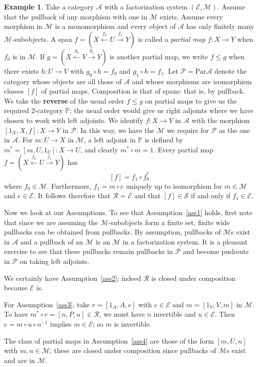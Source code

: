\documentclass[a4paper,12pt,reqno]{amsart}
\theoremstyle{definition}
\newtheorem{example}[theorem]{Example}
\theoremstyle{fact}
\theoremstyle{genquest}
\theoremstyle{step}
\newcommand{\lra}{\longrightarrow}
\newcommand{\lla}{\longleftarrow}
\newcommand{\ra}{\rightarrow}
\def\CA{{\mathscr A}}
\def\CE{{\mathscr E}}
\def\CM{{\mathscr M}}
\def\CP{{\mathscr P}}
\def\CR{{\mathscr R}}
\def\CS{{\mathscr S}}
\begin{document}
\begin{example}\label{Ex1+}
Take a category $\CA$ with a factorization system $(\CE,\CM)$. 
Assume that the pullback of any morphism with one in $\CM$ exists. 
Assume every morphism in $\CM$ is a monomorphism and every object
of $\CA$ has only finitely many $\CM$-subobjects. 
A span $f = (X\stackrel{f_0}\lla U \stackrel{f_1}\lra Y)$ is called a {\em partial map}
$f : X\lra Y$ when $f_0$ is in $\CM$. 
If $g = (X\stackrel{g_0}\lla V \stackrel{g_1}\lra Y)$ is another partial map,
we write $f\le g$ when there exists $h:U\ra V$ with $g_0\circ h=f_0$ and $g_1\circ h=f_1$.  
Let $\CP= \mathrm{Par}\CA$ 
denote the category
whose objects are all those of $\CA$ and whose morphisms are isomorphism
classes $[f]$ of partial maps. Composition is that of spans: that is, by pullback.
We take the \textbf{reverse} of the usual order $f\le g$ on partial maps to give us
the required 2-category $\mathbb{P}$; the usual order would give us right adjoints
where we have chosen to work with left adjoints.
We identify $f: X \ra Y$ in $\CA$ with the morphism $[1_X,X,f] : X \lra Y$ in $\CP$.
In this way, we have the $\CM$ we require for $\CP$ as the one in $\CA$.
For $m:U\ra X$ in $\CM$, a left adjoint in $\mathbb{P}$ is defined by 
$m^*= [m,U,1_U] : X\ra U$, and clearly $m^*\circ m = 1$.
Every partial map $f = (X\stackrel{f_0}\lla U \stackrel{f_1}\lra Y)$ has $$[f] = f_{1}\circ f_0^* $$
where $f_0\in \CM$. Furthermore, $f_1 = m\circ e$ uniquely up to isomorphism
for $m\in \CM$ and $e\in \CE$. 
It follows therefore that $\CR=\CE$ and that $[f]\in \CS$ if and only if $f_1\in \CE$.

Now we look at our Assumptions. To see that Assumption~\ref{ass1} holds, first note
that since we are assuming the $\CM$-subobjects form a finite set, 
finite wide pullbacks can be obtained from pullbacks.
By assumption, pullbacks of $\CM$s exist in $\CA$ and a pullback of an 
$\CM$ is an $\CM$ in a factorization system.
It is a pleasant exercise to see that these pullbacks remain pullbacks in $\CP$
and become pushouts in $\CP$ on taking left adjoints. 

We certainly have Assumption~\ref{ass2}; 
indeed $\CR$ is closed under composition because $\CE$ is.

For Assumption~\ref{ass3}, take $r=[1_A,A,e]$ with $e\in \CE$ and 
$m=[1_V,V,m]$ in $\CM$. To have $m^*\circ r = [n,P,u] \in \CR$, we must have
$n$ invertible and $u\in \CE$. Then $e=m\circ u \circ n^{-1}$ implies $m\in \CE$;
so $m$ is invertible. 

The class of partial maps in Assumption~\ref{ass4} are those
of the form $[m,U,n]$ with $m,n\in \CM$; these are closed under composition since
pullbacks of $\CM$s exist and are in $\CM$. 


\end{example}
\end{document}
